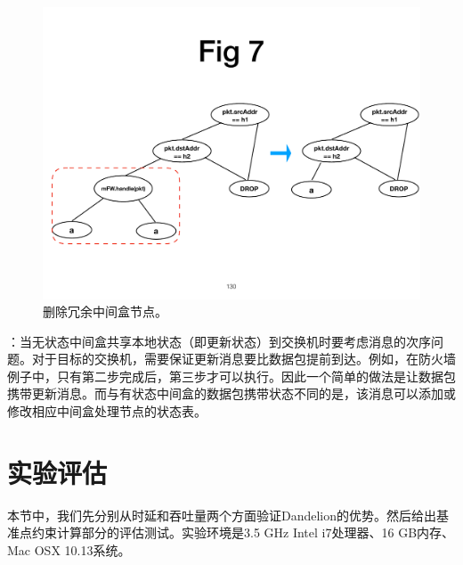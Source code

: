 \begin{figure}[!htbp]
\centering
      \centering\includegraphics[width=\linewidth]{figures/ss-130.pdf}
\caption{删除冗余中间盒节点。}
\label{fig:rv}
\end{figure}

：当无状态中间盒共享本地状态（即更新状态）到交换机时要考虑消息的次序问题。对于目标的交换机，需要保证更新消息要比数据包提前到达。例如，在防火墙例子中，只有第二步完成后，第三步才可以执行。因此一个简单的做法是让数据包携带更新消息。而与有状态中间盒的数据包携带状态不同的是，该消息可以添加或修改相应中间盒处理节点的状态表。


\section{实验评估}

本节中，我们先分别从时延和吞吐量两个方面验证Dandelion的优势。然后给出基准点约束计算部分的评估测试。实验环境是3.5 GHz Intel i7处理器、16 GB内存、Mac OSX 10.13系统。

